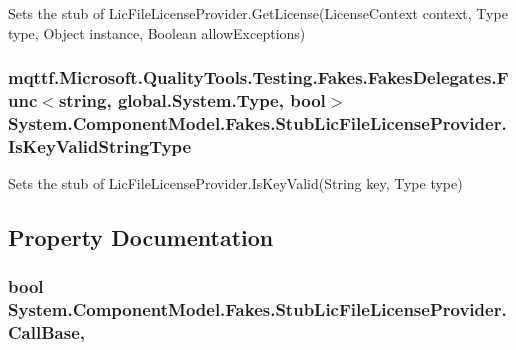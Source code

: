 Sets the stub of Lic\-File\-License\-Provider.\-Get\-License(\-License\-Context context, Type type, Object instance, Boolean allow\-Exceptions)

\hypertarget{class_system_1_1_component_model_1_1_fakes_1_1_stub_lic_file_license_provider_a15a698e44351cf6f12ed795985bf8a92}{
\subsubsection[{Is\-Key\-Valid\-String\-Type}]{\setlength{\rightskip}{0pt plus 5cm}mqttf.\-Microsoft.\-Quality\-Tools.\-Testing.\-Fakes.\-Fakes\-Delegates.\-Func$<$string, global.\-System.\-Type, bool$>$ System.\-Component\-Model.\-Fakes.\-Stub\-Lic\-File\-License\-Provider.\-Is\-Key\-Valid\-String\-Type}}\label{class_system_1_1_component_model_1_1_fakes_1_1_stub_lic_file_license_provider_a15a698e44351cf6f12ed795985bf8a92}


Sets the stub of Lic\-File\-License\-Provider.\-Is\-Key\-Valid(\-String key, Type type)



\subsection{Property Documentation}
\hypertarget{class_system_1_1_component_model_1_1_fakes_1_1_stub_lic_file_license_provider_ae94bbc1153bac356ba70c4bf3e5bf165}{
\subsubsection[{Call\-Base}]{\setlength{\rightskip}{0pt plus 5cm}bool System.\-Component\-Model.\-Fakes.\-Stub\-Lic\-File\-License\-Provider.\-Call\-Base\hspace{0.3cm}{\ttfamily [get]}, {\ttfamily [set]}}}\label{class_system_1_1_component_model_1_1_fakes_1_1_stub_lic_file_license_provider_ae94bbc1153bac356ba70c4bf3e5bf165}


